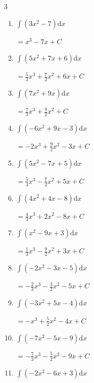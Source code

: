 \begin{multicols}{3}
\begin{enumerate}
  \item $\displaystyle \int \left( 3x^{2}-7 \right) \mathrm{d}x$

        $\displaystyle =x^{3}-7x+ C$

  \item $\displaystyle \int \left( 5x^{2}+7x+6 \right) \mathrm{d}x$

        $\displaystyle =\frac{5}{3}x^{3}+\frac{7}{2}x^{2}+6x+ C$

  \item $\displaystyle \int \left( 7x^{2}+9x \right) \mathrm{d}x$

        $\displaystyle =\frac{7}{3}x^{3}+\frac{9}{2}x^{2}+ C$

  \item $\displaystyle \int \left( -6x^{2}+9x-3 \right) \mathrm{d}x$

        $\displaystyle =-2x^{3}+\frac{9}{2}x^{2}-3x+ C$

\columnbreak %

  \item $\displaystyle \int \left( 5x^{2}-7x+5 \right) \mathrm{d}x$

        $\displaystyle =\frac{5}{3}x^{3}-\frac{7}{2}x^{2}+5x+ C$

  \item $\displaystyle \int \left( 4x^{2}+4x-8 \right) \mathrm{d}x$

        $\displaystyle =\frac{4}{3}x^{3}+2x^{2}-8x+ C$

  \item $\displaystyle \int \left( x^{2}-9x+3 \right) \mathrm{d}x$

        $\displaystyle =\frac{1}{3}x^{3}-\frac{9}{2}x^{2}+3x+ C$

  \item $\displaystyle \int \left( -2x^{2}-3x-5 \right) \mathrm{d}x$

        $\displaystyle =-\frac{2}{3}x^{3}-\frac{3}{2}x^{2}-5x+ C$

  \item $\displaystyle \int \left( -3x^{2}+5x-4 \right) \mathrm{d}x$

        $\displaystyle =-x^{3}+\frac{5}{2}x^{2}-4x+ C$

  \item $\displaystyle \int \left( -7x^{2}-5x-9 \right) \mathrm{d}x$

        $\displaystyle =-\frac{7}{3}x^{3}-\frac{5}{2}x^{2}-9x+ C$

  \item $\displaystyle \int \left( -2x^{2}-6x+3 \right) \mathrm{d}x$


\end{enumerate}
\end{multicols}
